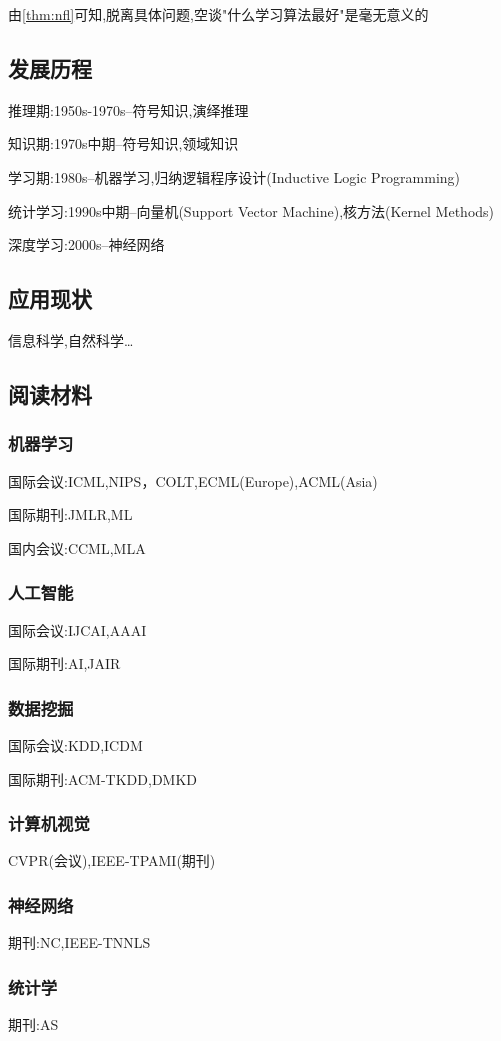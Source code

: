 由\ref{thm:nfl}可知,脱离具体问题,空谈"什么学习算法最好"是毫无意义的
\subsection{发展历程}
推理期:1950s-1970s--符号知识,演绎推理

知识期:1970s中期--符号知识,领域知识

学习期:1980s--机器学习,归纳逻辑程序设计(Inductive Logic Programming)

统计学习:1990s中期--向量机(Support Vector Machine),核方法(Kernel Methods)

深度学习:2000s--神经网络

\subsection{应用现状}
信息科学,自然科学\dots

\subsection{阅读材料}
\subsubsection{机器学习}
国际会议:ICML,NIPS，COLT,ECML(Europe),ACML(Asia)

国际期刊:JMLR,ML

国内会议:CCML,MLA

\subsubsection{人工智能}
国际会议:IJCAI,AAAI

国际期刊:AI,JAIR

\subsubsection{数据挖掘}
国际会议:KDD,ICDM

国际期刊:ACM-TKDD,DMKD

\subsubsection{计算机视觉}
CVPR(会议),IEEE-TPAMI(期刊)

\subsubsection{神经网络}
期刊:NC,IEEE-TNNLS
\subsubsection{统计学}
期刊:AS

